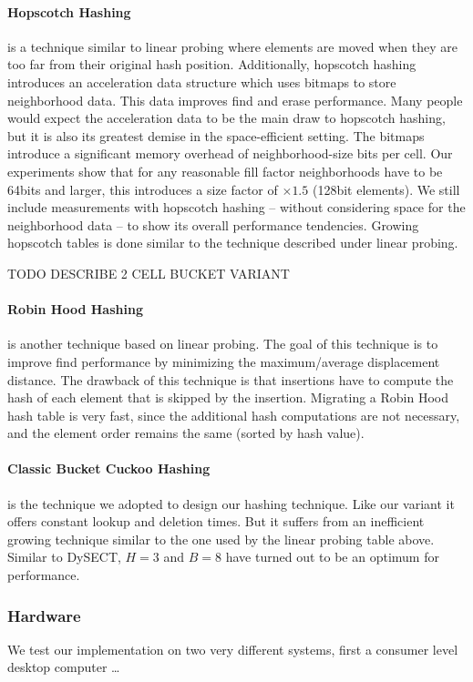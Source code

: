 \documentclass[a4paper,UKenglish]{lipics-v2016}
\begin{document}
\paragraph*{Hopscotch Hashing} is a technique similar to linear probing where
elements are moved when they are too far from their original hash
position.  Additionally, hopscotch hashing introduces an acceleration
data structure which uses bitmaps to store neighborhood data. This
data improves find and erase performance.  Many people would expect
the acceleration data to be the main draw to hopscotch hashing, but it
is also its greatest demise in the space-efficient setting.  The
bitmaps introduce a significant memory overhead of neighborhood-size
bits per cell.  Our experiments show that for any reasonable fill
factor neighborhoods have to be 64bits and larger, this introduces a
size factor of $\times1.5$ (128bit elements).  We still include
measurements with hopscotch hashing -- without considering space for
the neighborhood data -- to show its overall performance tendencies.
Growing hopscotch tables is done similar to the technique described
under linear probing.

TODO DESCRIBE 2 CELL BUCKET VARIANT

\paragraph*{Robin Hood Hashing} is another technique based on linear probing. The
goal of this technique is to improve find performance by minimizing
the maximum/average displacement distance.  The drawback of this
technique is that insertions have to compute the hash of each element
that is skipped by the insertion.  Migrating a Robin Hood hash table
is very fast, since the additional hash computations are not
necessary, and the element order remains the same (sorted by hash value).

\paragraph*{Classic Bucket Cuckoo Hashing} is the technique we adopted to
design our hashing technique.  Like our variant it offers constant
lookup and deletion times.  But it suffers from an inefficient
growing technique similar to the one used by the linear probing table above.
Similar to DySECT, $H=3$ and $B=8$ have turned out to be an optimum
for performance.

\subsubsection*{Hardware}
We test our implementation on two very different systems, first a
consumer level desktop computer \ldots{}
\end{document}
